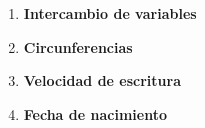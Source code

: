 \begin{enumerate}
    \item \textbf{Intercambio de variables}\\
    

    \item \textbf{Circunferencias}\\
    

    \item \textbf{Velocidad de escritura}\\
    

    \item \textbf{Fecha de nacimiento}\\
    
\end{enumerate}

\newpage
